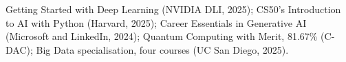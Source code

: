 
Getting Started with Deep Learning (NVIDIA DLI, 2025); CS50's Introduction to AI with Python (Harvard, 2025); Career Essentials in Generative AI (Microsoft and LinkedIn, 2024); Quantum Computing with Merit, 81.67\% (C-DAC); Big Data specialisation, four courses (UC San Diego, 2025).

